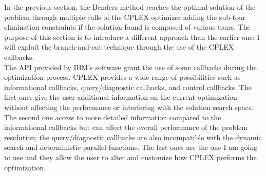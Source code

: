 In the previous section, the Benders method reaches the optimal solution of the problem through multiple calls of the CPLEX optimizer adding the sub-tour elimination constraints if the solution found is composed of various tours. The purpose of this section is to introduce a different approach than the earlier one: I will exploit the branch-and-cut technique through the use of the CPLEX callbacks.\\
The API provided by IBM's software grant the use of some callbacks during the optimization process. CPLEX provides a wide range of possibilities such as informational callbacks, query/diagnostic callbacks, and control callbacks. The first ones give the user additional information on the current optimization without affecting the performance or interfering with the solution search space. The second one access to more detailed information compared to the informational callbacks but can affect the overall performance of the problem resolution; the query/diagnostic callbacks are also incompatible with the dynamic search and deterministic parallel functions.  The last ones are the one I am going to use and they allow the user to alter and customize how CPLEX performs the optimization.\\


